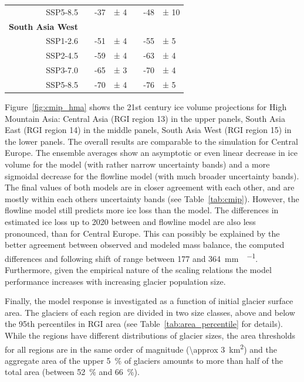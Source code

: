 \begin{table}[htp]
\begin{tabular}{@{}rlrllrl@{}}
          SSP5-8.5 & \phantom{a} & -37 & ± 4 & \phantom{a} & -48 & ± 10\\
          \textbf{South Asia West}\\
          SSP1-2.6 & \phantom{a} & -51 & ± 4 & \phantom{a} & -55 & ± 5\\
          SSP2-4.5 & \phantom{a} & -59 & ± 4 & \phantom{a} & -63 & ± 4\\
          SSP3-7.0 & \phantom{a} & -65 & ± 3 & \phantom{a} & -70 & ± 4\\
          SSP5-8.5 & \phantom{a} & -70 & ± 4 & \phantom{a} & -76 & ± 5\\
          \bottomrule
        \end{tabular}
      \end{table}

      Figure~\ref{fig:cmip_hma} shows the 21st century ice volume projections for High Mountain Asia: Central Asia (RGI region 13) in the upper panels, South Asia East (RGI region 14) in the middle panels, South Asia West (RGI region 15) in the lower panels. The overall results are comparable to the simulation for Central Europe. The ensemble averages show an asymptotic or even linear decrease in ice volume for the \vas{} model (with rather narrow uncertainty bands) and a more sigmoidal decrease for the flowline model (with much broader uncertainty bands). The final values of both models are in closer agreement with each other, and are mostly within each others uncertainty bands (see Table~\ref{tab:cmip}). However, the flowline model still predicts more ice loss than the \vas{} model. The differences in estimated ice loss up to 2020 between \vas{} and flowline model are also less pronounced, than for Central Europe. This can possibly be explained by the better agreement between observed and modeled mass balance, the computed differences and following shift of \bias{} range between 177 and \SI{364}{\milli\metre\waterequivalent\per\year}. Furthermore, given the empirical nature of the scaling relations the model performance increases with increasing glacier population size.%


      Finally, the model response is investigated as a function of initial glacier surface area. The glaciers of each region are divided in two size classes, above and below the 95th percentiles in RGI area (see Table~\ref{tab:area_percentile} for details). While the regions have different distributions of glacier sizes, the area thresholds for all regions are in the same order of magnitude (\SI{\approx 3}{\square\kilo\meter}) and the aggregate area of the upper \SI{5}{\percent} of glaciers amounts to more than half of the total area (between \SI{52}{\percent} and \SI{66}{\percent}).

